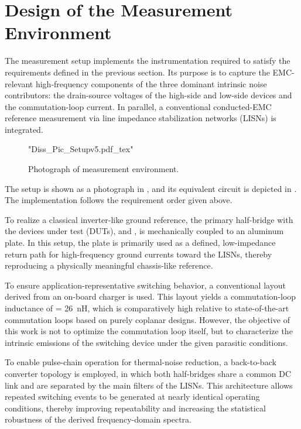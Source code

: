 
\section{Design of the Measurement Environment}
The measurement setup implements the instrumentation required to satisfy the requirements defined in the previous section.
Its purpose is to capture the EMC-relevant high-frequency components of the three dominant intrinsic noise contributors: the drain-source voltages of the high-side and low-side devices and the commutation-loop current.
In parallel, a conventional conducted-EMC reference measurement via line impedance stabilization networks (LISNs) is integrated.

\begin{figure}[ht]
	\centering
	{"Diss_Pic_Setupv5.pdf_tex"}
	\caption{Photograph of measurement environment.}\label{fig:pic_b2b_setup}
\end{figure}

The setup is shown as a photograph in , and its equivalent circuit is depicted in .
The implementation follows the requirement order given above.

To realize a classical inverter-like ground reference, the primary half-bridge with the devices under test (DUTs),  and , is mechanically coupled to an aluminum plate.
In this setup, the plate is primarily used as a defined, low-impedance return path for high-frequency ground currents toward the LISNs, thereby reproducing a physically meaningful chassis-like reference.

To ensure application-representative switching behavior, a conventional layout derived from an on-board charger is used.
This layout yields a commutation-loop inductance of  = \SI{26}{nH}, which is comparatively high relative to state-of-the-art commutation loops based on purely coplanar designs.
However, the objective of this work is not to optimize the commutation loop itself, but to characterize the intrinsic emissions of the switching device under the given parasitic conditions.

To enable pulse-chain operation for thermal-noise reduction, a back-to-back converter topology is employed, in which both half-bridges share a common DC link and are separated by the main filters of the LISNs.
This architecture allows repeated switching events to be generated at nearly identical operating conditions, thereby improving repeatability and increasing the statistical robustness of the derived frequency-domain spectra.

